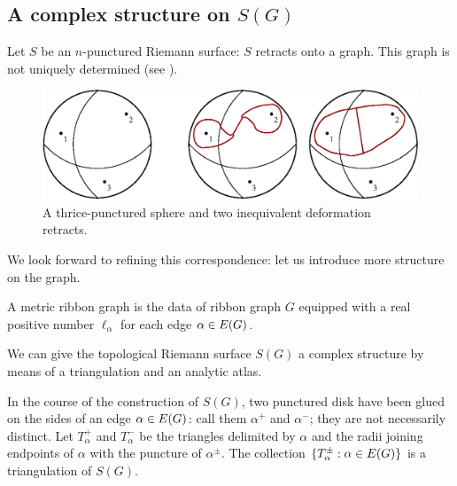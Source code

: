 \subsection{A complex structure on $S(G)$}
\label{sec:atlas}

Let $S$ be an $n$-punctured Riemann surface: $S$ retracts onto a
graph. This graph is not uniquely determined (see
).
\begin{figure}[bt]
  \centering\includegraphics[width=\textwidth]{sfera3}
  \caption{A thrice-punctured sphere and two inequivalent
    deformation retracts.} 
  \label{fig:sphere-retracts}
\end{figure}
We look forward to refining this correspondence: let us introduce more
structure on the graph.
\begin{definition}
  \label{dfn:metric-ribbon-graphs}
  A metric ribbon graph is the data of ribbon graph $G$ equipped with
  a real positive number $\ell_\alpha$ for each edge $\alpha \in E(G)$.
\end{definition}

We can give the topological Riemann surface $S(G)$ a complex structure
by means of a triangulation and an analytic atlas.

In the course of the construction of $S(G)$, two punctured disk have
been glued on the sides of an edge $\alpha \in E(G)$: call them $\alpha^+$
and $\alpha^-$; they are not necessarily distinct.  Let $T_\alpha^+$ and $T_\alpha^-$
be the triangles delimited by $\alpha$ and the radii joining endpoints of
$\alpha$ with the puncture of $\alpha^\pm$. The collection $\{T_\alpha^\pm : \alpha \in
E(G)\}$ is a triangulation of $S(G)$.

